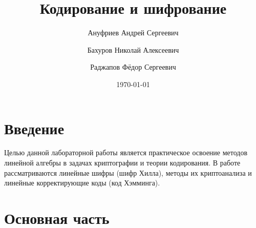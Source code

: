 \documentclass[a4paper, 12pt]{article}
\title{Кодирование и шифрование}
\author{Ануфриев Андрей Сергеевич}
\affil{465029}
\author{Бахуров Николай Алексеевич}
\affil{504862}
\author{Раджапов Фёдор Сергеевич}
\affil{502544}
\date{\today}
\begin{document}
\maketitle

\newpage
\tableofcontents
\newpage

\section{Введение}
Целью данной лабораторной работы является практическое освоение методов линейной алгебры в задачах криптографии и теории кодирования. В работе рассматриваются линейные шифры (шифр Хилла), методы их криптоанализа и линейные корректирующие коды (код Хэмминга).

\section{Основная часть}



\newpage



\newpage


\end{document}

